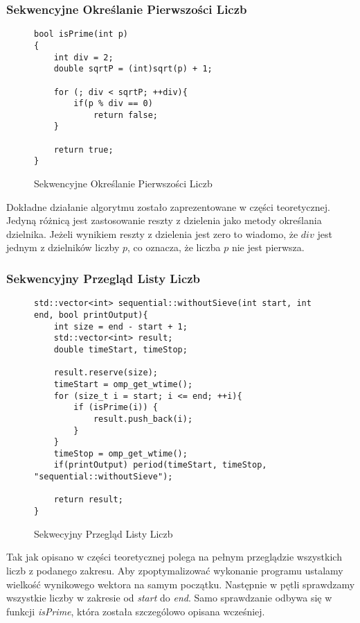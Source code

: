 \documentclass{article}
\begin{document}
            \subsubsection{Sekwencyjne Określanie Pierwszości Liczb}
                \begin{figure}[H]
                    \begin{verbatim}
bool isPrime(int p)
{
	int div = 2;
	double sqrtP = (int)sqrt(p) + 1;

	for (; div < sqrtP; ++div){ 
		if(p % div == 0) 
			return false;
	}

	return true;
}
                    \end{verbatim}
                    \caption{Sekwencyjne Określanie Pierwszości Liczb}
                \end{figure}
                Dokładne działanie algorytmu zostało zaprezentowane w części teoretycznej. Jedyną różnicą jest zastosowanie reszty z dzielenia jako metody określania dzielnika. Jeżeli wynikiem reszty z dzielenia jest zero to wiadomo, że $div$ jest jednym z dzielników liczby $p$, co oznacza, że liczba $p$ nie jest pierwsza.
                
            \subsubsection{Sekwencyjny Przegląd Listy Liczb}
                \begin{figure}[H]
                    \begin{verbatim}
std::vector<int> sequential::withoutSieve(int start, int end, bool printOutput){
    int size = end - start + 1;
    std::vector<int> result;
    double timeStart, timeStop;
                
    result.reserve(size);
    timeStart = omp_get_wtime();
    for (size_t i = start; i <= end; ++i){
        if (isPrime(i)) {
            result.push_back(i);
        }
    }
    timeStop = omp_get_wtime();
    if(printOutput) period(timeStart, timeStop, "sequential::withoutSieve");
                
    return result;
}
                    \end{verbatim}
                    \caption{Sekwecyjny Przegląd Listy Liczb}
                \end{figure}
                Tak jak opisano w części teoretycznej polega na pełnym przeglądzie wszystkich liczb z podanego zakresu. Aby zpoptymalizować wykonanie programu ustalamy wielkość wynikowego wektora na samym początku. Następnie w pętli sprawdzamy wszystkie liczby w zakresie od \emph{start} do \emph{end}. Samo sprawdzanie odbywa się w funkcji \emph{isPrime}, która została szczególowo opisana wcześniej.
                
\end{document}
